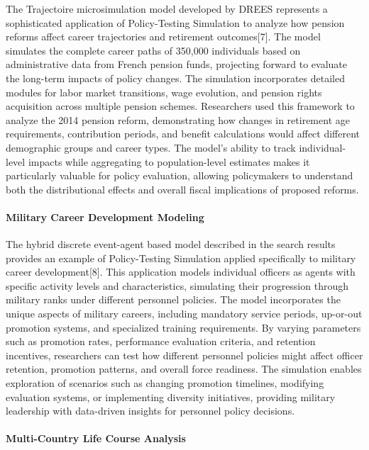 \documentclass[main.tex]{subfiles}
\begin{document}
The Trajectoire microsimulation model developed by DREES represents a sophisticated application of Policy-Testing Simulation to analyze how pension reforms affect career trajectories and retirement outcomes[7]. The model simulates the complete career paths of 350,000 individuals based on administrative data from French pension funds, projecting forward to evaluate the long-term impacts of policy changes. The simulation incorporates detailed modules for labor market transitions, wage evolution, and pension rights acquisition across multiple pension schemes. Researchers used this framework to analyze the 2014 pension reform, demonstrating how changes in retirement age requirements, contribution periods, and benefit calculations would affect different demographic groups and career types. The model's ability to track individual-level impacts while aggregating to population-level estimates makes it particularly valuable for policy evaluation, allowing policymakers to understand both the distributional effects and overall fiscal implications of proposed reforms.

\paragraph{Military Career Development Modeling}

The hybrid discrete event-agent based model described in the search results provides an example of Policy-Testing Simulation applied specifically to military career development[8]. This application models individual officers as agents with specific activity levels and characteristics, simulating their progression through military ranks under different personnel policies. The model incorporates the unique aspects of military careers, including mandatory service periods, up-or-out promotion systems, and specialized training requirements. By varying parameters such as promotion rates, performance evaluation criteria, and retention incentives, researchers can test how different personnel policies might affect officer retention, promotion patterns, and overall force readiness. The simulation enables exploration of scenarios such as changing promotion timelines, modifying evaluation systems, or implementing diversity initiatives, providing military leadership with data-driven insights for personnel policy decisions.

\paragraph{Multi-Country Life Course Analysis}
\end{document}
